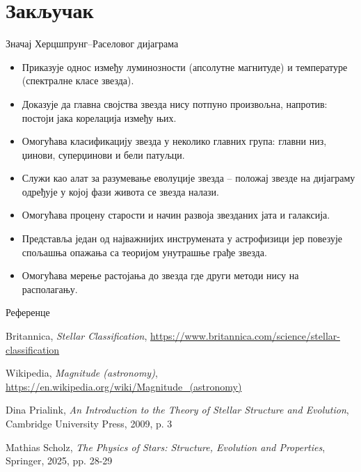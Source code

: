 \documentclass[aspectratio=169, xcolor=table, 10pt]{beamer}
\begin{document}
\section{Закључак}

\begin{frame}{Значај Херцшпрунг–Раселовог дијаграма}
  \begin{itemize}
    \item Приказује однос између луминозности (апсолутне магнитуде) и температуре (спектралне класе звезда).
    \item Доказује да главна својства звезда нису потпуно произвољна, напротив: постоји јака корелација између њих.
    \item Омогућава класификацију звезда у неколико главних група: главни низ, џинови, суперџинови и бели патуљци.
    \item Служи као алат за разумевање еволуције звезда – положај звезде на дијаграму одређује у којој фази живота се звезда налази.
    \item Омогућава процену старости и начин развоја звезданих јата и галаксија.
    \item Представља један од најважнијих инструмената у астрофизици јер повезује спољашња опажања са теоријом унутрашње грађе звезда.
    \item Омогућава мерење растојања до звезда где други методи нису на располагању.
  \end{itemize}
\end{frame}

\begin{frame}{Референце}
    \begin{thebibliography}{9}

      Britannica,
      \textit{Stellar Classification},
      \url{https://www.britannica.com/science/stellar-classification}

      Wikipedia,
      \textit{Magnitude (astronomy)},
      \url{https://en.wikipedia.org/wiki/Magnitude_(astronomy)}

      Dina Prialink,
      \textit{An Introduction to the Theory of Stellar Structure and Evolution},
      Cambridge University Press, 2009, p. 3

      Mathias Scholz,
      \textit{The Physics of Stars: Structure, Evolution and Properties},
      Springer, 2025, pp. 28-29

    \end{thebibliography}
\end{frame}
\end{document}
